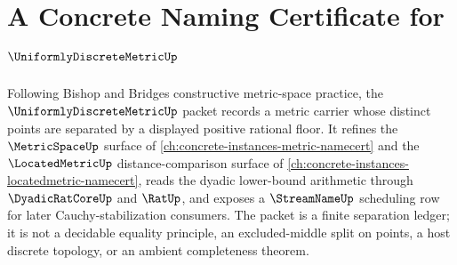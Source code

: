 \chapter{A Concrete Naming Certificate for $\UniformlyDiscreteMetricUp$}
\label{ch:concrete-instances-uniformly-discrete-metric-namecert}

Following Bishop and Bridges constructive metric-space practice, the $\UniformlyDiscreteMetricUp$ packet records a metric carrier whose distinct points are separated by a displayed positive rational floor. It refines the $\MetricSpaceUp$ surface of \autoref{ch:concrete-instances-metric-namecert} and the $\LocatedMetricUp$ distance-comparison surface of \autoref{ch:concrete-instances-locatedmetric-namecert}, reads the dyadic lower-bound arithmetic through $\DyadicRatCoreUp$ and $\RatUp$, and exposes a $\StreamNameUp$ scheduling row for later Cauchy-stabilization consumers. The packet is a finite separation ledger; it is not a decidable equality principle, an excluded-middle split on points, a host discrete topology, or an ambient completeness theorem.

